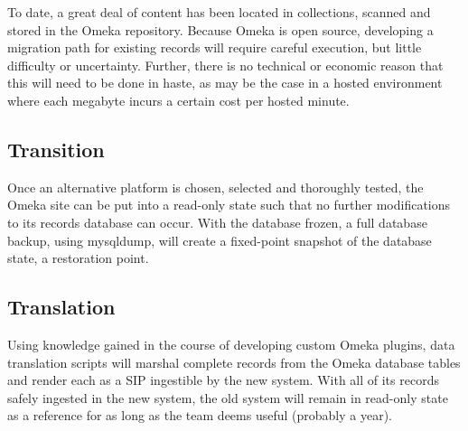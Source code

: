 To date, a great deal of content has been located in collections, scanned and stored in the Omeka repository. Because Omeka is open source, developing a migration path for existing records will require careful execution, but little difficulty or uncertainty. Further, there is no technical or economic reason that this will need to be done in haste, as may be the case in a hosted environment where each megabyte incurs a certain cost per hosted minute. 
\subsection{Transition}
Once an alternative platform is chosen, selected and thoroughly tested, the Omeka site can be put into a read-only state such that no further modifications to its records database can occur. With the database frozen, a full database backup, using mysqldump, will create a fixed-point snapshot of the database state, a restoration point.
\subsection{Translation}
Using knowledge gained in the course of developing custom Omeka plugins, data translation scripts will marshal complete records from the Omeka database tables and render each as a SIP ingestible by the new system. With all of its records safely ingested in the new system, the old system will remain in read-only state as a reference for as long as the team deems useful (probably a year).